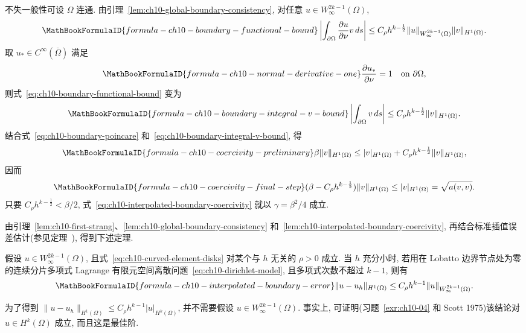 \begin{Proof}
不失一般性可设 $\Omega$ 连通. 由引理~\ref{lem:ch10-global-boundary-consistency}, 对任意 $u\in W_\infty^{2k-1}(\Omega)$,
\begin{equation}
\MathBookFormulaID{formula-ch10-boundary-functional-bound}
\label{eq:ch10-boundary-functional-bound}
\left|\int_{\partial\Omega}\frac{\partial u}{\partial\nu}v\,ds\right|
\leq C_\rho h^{k-\frac12}\|u\|_{W_\infty^{2k-1}(\Omega)}\|v\|_{H^1(\Omega)}.
\end{equation}
取 $u_*\in C^\infty(\overline\Omega)$ 满足
\begin{equation}
\MathBookFormulaID{formula-ch10-normal-derivative-one}
\label{eq:ch10-normal-derivative-one}
\frac{\partial u_*}{\partial\nu}=1\quad\text{on }\partial\Omega,
\end{equation}
则式~\eqref{eq:ch10-boundary-functional-bound} 变为
\begin{equation}
\MathBookFormulaID{formula-ch10-boundary-integral-v-bound}
\label{eq:ch10-boundary-integral-v-bound}
\left|\int_{\partial\Omega}v\,ds\right|
\leq C_\rho h^{k-\frac12}\|v\|_{H^1(\Omega)}.
\end{equation}
结合式~\eqref{eq:ch10-boundary-poincare} 和~\eqref{eq:ch10-boundary-integral-v-bound}, 得
\begin{equation}
\MathBookFormulaID{formula-ch10-coercivity-preliminary}
\label{eq:ch10-coercivity-preliminary}
\beta\|v\|_{H^1(\Omega)}\leq|v|_{H^1(\Omega)}
+C_\rho h^{k-\frac12}\|v\|_{H^1(\Omega)},
\end{equation}
因而
\begin{equation}
\MathBookFormulaID{formula-ch10-coercivity-final-step}
\label{eq:ch10-coercivity-final-step}
(\beta-C_\rho h^{k-\frac12})\|v\|_{H^1(\Omega)}
\leq|v|_{H^1(\Omega)}=\sqrt{a(v,v)}.
\end{equation}
只要 $C_\rho h^{k-\frac12}<\beta/2$, 式~\eqref{eq:ch10-interpolated-boundary-coercivity} 就以 $\gamma=\beta^2/4$ 成立.
\end{Proof}

由引理~\ref{lem:ch10-first-strang}、\ref{lem:ch10-global-boundary-consistency} 和~\ref{lem:ch10-interpolated-boundary-coercivity}, 再结合标准插值误差估计(参见定理~), 得到下述定理.

\begin{Theorem}
\label{thm:ch10-interpolated-boundary-error}
假设 $u\in W_\infty^{2k-1}(\Omega)$, 且式~\eqref{eq:ch10-curved-element-disks} 对某个与 $h$ 无关的 $\rho>0$ 成立. 当 $h$ 充分小时, 若用在 Lobatto 边界节点处为零的连续分片多项式 Lagrange 有限元空间离散问题~\eqref{eq:ch10-dirichlet-model}, 且多项式次数不超过 $k-1$, 则有
\begin{equation}
\MathBookFormulaID{formula-ch10-interpolated-boundary-error}
\label{eq:ch10-interpolated-boundary-error}
\|u-u_h\|_{H^1(\Omega)}\leq C_\rho h^{k-1}\|u\|_{W_\infty^{2k-1}(\Omega)}.
\end{equation}
\end{Theorem}

为了得到 $\|u-u_h\|_{H^1(\Omega)}\leq C_\rho h^{k-1}|u|_{H^k(\Omega)}$, 并不需要假设 $u\in W_\infty^{2k-1}(\Omega)$. 事实上, 可证明(习题~\ref{exr:ch10-04} 和 Scott 1975)该结论对 $u\in H^k(\Omega)$ 成立, 而且这是最佳阶.
